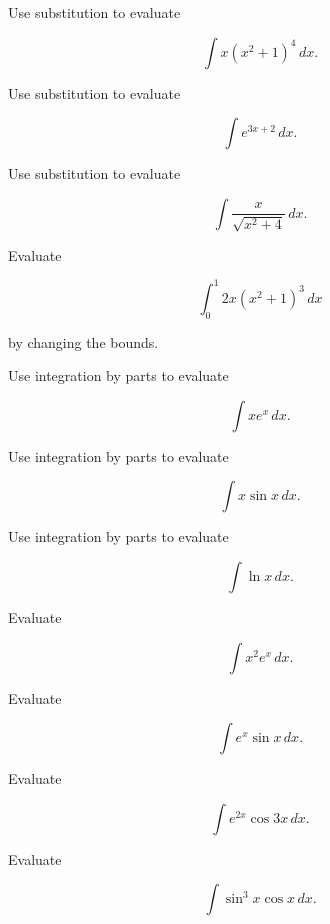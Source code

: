 \begin{exercise}[2]
Use substitution to evaluate

\[
\int
x(x^2+1)^4
\,dx.
\]
\end{exercise}

\begin{exercise}[2]
Use substitution to evaluate

\[
\int
e^{3x+2}
\,dx.
\]
\end{exercise}

\begin{exercise}[2]
Use substitution to evaluate

\[
\int
\frac{
x
}{
\sqrt{x^2+4}
}
\,dx.
\]
\end{exercise}

\begin{exercise}[2]
Evaluate

\[
\int_0^1
2x(x^2+1)^3
\,dx
\]

by changing the bounds.
\end{exercise}

\begin{exercise}[2]
Use integration by parts to evaluate

\[
\int xe^x\,dx.
\]
\end{exercise}

\begin{exercise}[2]
Use integration by parts to evaluate

\[
\int x\sin x\,dx.
\]
\end{exercise}

\begin{exercise}[2]
Use integration by parts to evaluate

\[
\int\ln x\,dx.
\]
\end{exercise}

\begin{exercise}[3]
Evaluate

\[
\int x^2e^x\,dx.
\]
\end{exercise}

\begin{exercise}[3]
Evaluate

\[
\int e^x\sin x\,dx.
\]
\end{exercise}

\begin{exercise}[3]
Evaluate

\[
\int e^{2x}\cos3x\,dx.
\]
\end{exercise}

\begin{exercise}[2]
Evaluate

\[
\int\sin^3x\cos x\,dx.
\]
\end{exercise}

